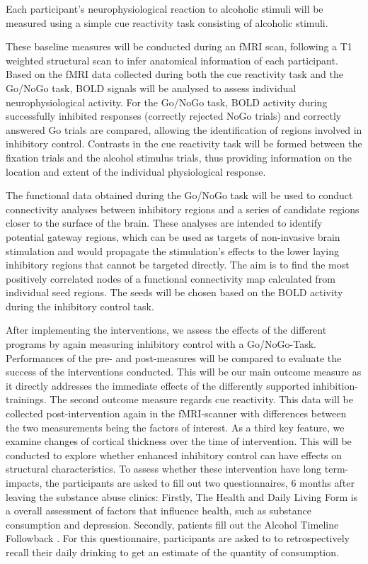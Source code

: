 \documentclass[12pt]{article}
\begin{document}
Each participant's neurophysiological reaction to alcoholic stimuli will be measured using a simple cue reactivity task consisting of alcoholic stimuli. 

These baseline measures will be conducted during an fMRI scan, following a T1 weighted structural scan to infer anatomical information of each participant. Based on the fMRI data collected during both the cue reactivity task and the Go/NoGo task, BOLD signals will be analysed to assess individual neurophysiological activity. For the Go/NoGo task, BOLD activity during successfully inhibited responses (correctly rejected NoGo trials) and correctly answered Go trials are compared, allowing the identification of regions involved in inhibitory control. Contrasts in the cue reactivity task will be formed between the fixation trials and the alcohol stimulus trials, thus providing information on the location and extent of the individual physiological response.

The functional data obtained during the Go/NoGo task will be used to conduct connectivity analyses between inhibitory regions and a series of candidate regions closer to the surface of the brain. These analyses are intended to identify potential gateway regions, which can be used as targets of non-invasive brain stimulation and would propagate the stimulation's effects to the lower laying inhibitory regions that cannot be targeted directly. The aim is to find the most positively correlated nodes of a functional connectivity map calculated from individual seed regions. The seeds will be chosen based on the BOLD activity during the inhibitory control task.

After implementing the interventions, we assess the effects of the different programs by again measuring inhibitory control with a Go/NoGo-Task. Performances of the pre- and post-measures will be compared to evaluate the success of the interventions conducted. This will be our main outcome measure as it directly addresses the immediate effects of the differently supported inhibition-trainings.
The second outcome measure regards cue reactivity. This data will be collected post-intervention again in the fMRI-scanner with differences between the two measurements being the factors of interest.
As a third key feature, we examine changes of cortical thickness over the time of intervention. This will be conducted to explore whether enhanced inhibitory control can have effects on structural characteristics.
To assess whether these intervention have long term-impacts, the participants are asked to fill out two questionnaires, 6 months after leaving the substance abuse clinics: Firstly, The Health and Daily Living Form \parencite{moosHealthDailyLiving1986} is a overall assessment of factors that influence health, such as substance consumption and depression. Secondly, patients fill out the Alcohol Timeline Followback \parencite{sobellAlcoholTimelineFollowback1995}. For this questionnaire, participants are asked to to retrospectively recall their daily drinking to get an estimate of the quantity of consumption.
\end{document}
